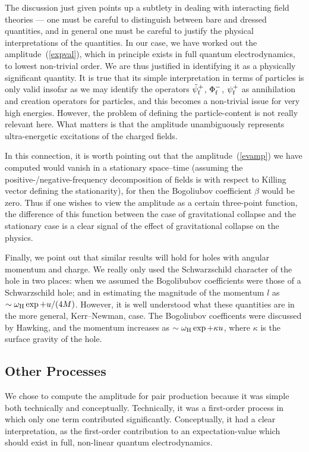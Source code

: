\documentclass[12pt]{article}
\begin{document}
The discussion just given points up a subtlety in dealing with
interacting field theories --- one must be careful to distinguish between bare
and dressed quantities, and in general one must be careful to justify the
physical interpretations of the quantities.  In our case, we have worked out the
amplitude~(\ref{expval}), which in principle exists in full quantum
electrodynamics, to lowest non-trivial order.  We are thus justified in
identifying it as a physically significant quantity.  It is true that its
simple
interpretation in terms of particles is only valid insofar as we may identify
the operators ${\tilde\psi}^+_{\rm f}$, $\Phi ^-_{\rm f}$, $\psi ^+_{\rm f}$ as
annihilation and creation operators for particles, and this becomes a
non-trivial issue for very high energies.  However, the problem of defining
the particle-content is not really relevant here.  What matters is that the
amplitude unambiguously represents ultra-energetic excitations of the
charged fields.

In this connection, it is worth pointing out that the amplitude~(\ref{evamp})
we have computed would vanish in a stationary space--time (assuming the
positive-/negative-frequency decomposition of fields is with respect to Killing
vector defining the stationarity), for then the Bogoliubov coefficient $\beta$
would be zero.  Thus if one wishes to view the amplitude as a certain
three-point function, the difference of this function between the case of
gravitational collapse and the stationary case is a clear signal of the effect
of gravitational collapse on the physics.

Finally, we point out that similar results will hold for holes with angular
momentum and charge.  We really only used the Schwarzschild character of the
hole in two places:  when we assumed the Bogolibubov coefficients were those of
a Schwarzschild hole; and in estimating the magnitude of the momentum $l$ as
$\sim\omega _{\rm H}\exp +u/(4M)$.  However, it is well understood what these
quantities are in the more general, Kerr--Newman, case.  The Bogoliubov
coefficents were discussed by Hawking, and the momentum increases as $\sim
\omega _{\rm H}\exp +\kappa u$, where $\kappa$ is the surface gravity of the
hole.

\subsection{Other Processes}

We chose to compute the amplitude for pair production because it was simple both
technically and conceptually.  Technically, it was a first-order process in
which only one term contributed significantly.  Conceptually, it had a clear
interpretation, as the first-order contribution to an expectation-value which
should exist in full, non-linear quantum electrodynamics.
\end{document}
